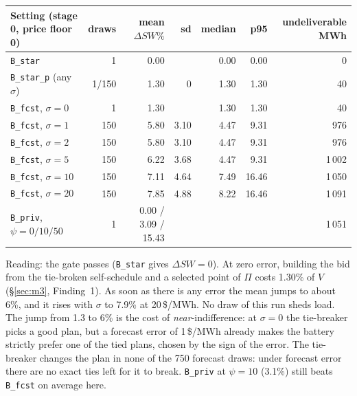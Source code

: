 \documentclass[10pt,a4paper]{article}
\newcommand{\code}[1]{\texttt{#1}}
\begin{document}
\begin{center}\small
\begin{tabular}{@{}lrrrrrr@{}}
\toprule
Setting (stage 0, price floor 0) & draws & mean $\Delta SW\%$ & sd & median & p95 & undeliverable MWh\\
\midrule
\code{B\_star} & 1 & 0.00 & & 0.00 & 0.00 & 0\\
\code{B\_star\_p} (any $\sigma$) & 1/150 & 1.30 & 0 & 1.30 & 1.30 & 40\\
\code{B\_fcst}, $\sigma=0$ & 1 & 1.30 & & 1.30 & 1.30 & 40\\
\code{B\_fcst}, $\sigma=1$ & 150 & 5.80 & 3.10 & 4.47 & 9.31 & 976\\
\code{B\_fcst}, $\sigma=2$ & 150 & 5.80 & 3.10 & 4.47 & 9.31 & 976\\
\code{B\_fcst}, $\sigma=5$ & 150 & 6.22 & 3.68 & 4.47 & 9.31 & 1\,002\\
\code{B\_fcst}, $\sigma=10$ & 150 & 7.11 & 4.64 & 7.49 & 16.46 & 1\,050\\
\code{B\_fcst}, $\sigma=20$ & 150 & 7.85 & 4.88 & 8.22 & 16.46 & 1\,091\\
\code{B\_priv}, $\psi=0/10/50$ & 1 & 0.00 / 3.09 / 15.43 & & & & 1\,051\\
\bottomrule
\end{tabular}
\end{center}
Reading: the gate passes (\code{B\_star} gives $\Delta SW=0$). At zero error, building the bid from the
tie-broken self-schedule and a selected point of $\Pi$ costs 1.30\% of $V$ (\S\ref{sec:m3}, Finding~1). As soon as there is any error the mean jumps to about 6\%, and it rises
with $\sigma$ to 7.9\% at 20\,\$/MWh. No draw of this run sheds load. The jump from 1.3 to 6\% is the cost of
\emph{near}-indifference: at $\sigma=0$ the tie-breaker picks a good plan, but a forecast error of 1\,\$/MWh
already makes the battery strictly prefer one of the tied plans, chosen by the sign of the error. The
tie-breaker changes the plan in none of the 750 forecast draws: under forecast error there are no exact ties
left for it to break. \code{B\_priv} at $\psi=10$ (3.1\%) still beats \code{B\_fcst} on average here.
\end{document}
